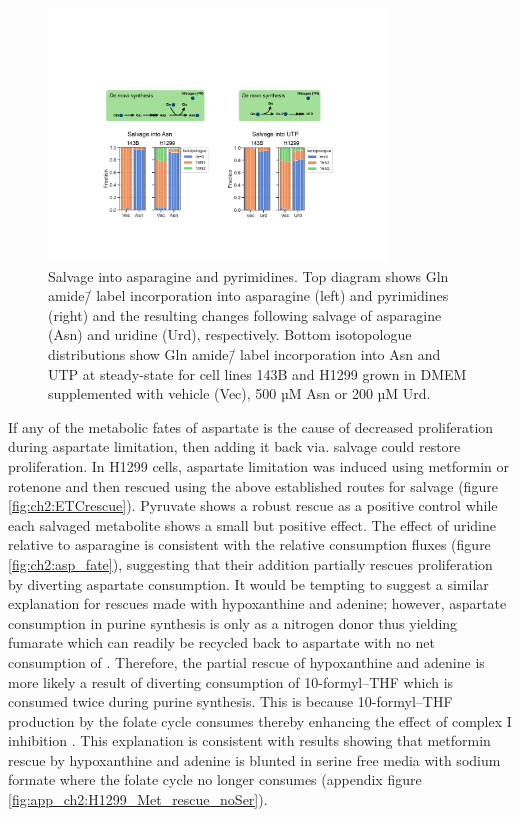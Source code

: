 \begin{figure}
    \centering
    \includegraphics[width=0.8\textwidth]{figures/chap2/sal_frac_pyr-asn.pdf}
    \caption[Salvage into asparagine and pyrimidines.]{
    Salvage into asparagine and pyrimidines.
    Top diagram shows Gln amide\=/\hNi{} label incorporation into asparagine (left) and pyrimidines (right) and the resulting changes following salvage of asparagine (Asn) and uridine (Urd), respectively.
    Bottom isotopologue distributions show Gln amide\=/\hNi{} label incorporation into Asn and UTP at steady-state for cell lines 143B and H1299 grown in DMEM supplemented with vehicle (Vec), 500 µM Asn or 200 µM Urd.
    }
    \label{fig:ch2:sal_frac_pyr-asn}
\end{figure}




If any of the metabolic fates of aspartate is the cause of decreased proliferation during aspartate limitation, then adding it back via. salvage could restore proliferation.
In H1299 cells, aspartate limitation was induced using metformin or rotenone and then rescued using the above established routes for salvage (figure \ref{fig:ch2:ETCrescue}).
Pyruvate shows a robust rescue as a positive control while each salvaged metabolite shows a small but positive effect.
The effect of uridine relative to asparagine is consistent with the relative consumption fluxes (figure \ref{fig:ch2:asp_fate}), suggesting that their addition partially rescues proliferation by diverting aspartate consumption.
It would be tempting to suggest a similar explanation for rescues made with hypoxanthine and adenine; however, aspartate consumption in purine synthesis is only as a nitrogen donor thus yielding fumarate which can readily be recycled back to aspartate with no net consumption of \NAD{}.
Therefore, the partial rescue of hypoxanthine and adenine is more likely a result of diverting consumption of 10-formyl–THF which is consumed twice during purine synthesis.
This is because 10-formyl–THF production by the folate cycle consumes \NAD{} thereby enhancing the effect of complex I inhibition \cite{Yang2020-fs}.
This explanation is consistent with results showing that metformin rescue by hypoxanthine and adenine is blunted in serine free media with sodium formate where the folate cycle no longer consumes \NAD{} (appendix figure \ref{fig:app_ch2:H1299_Met_rescue_noSer}).

